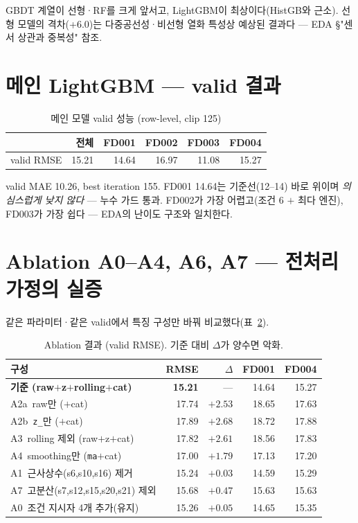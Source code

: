 \documentclass[11pt]{article}
\begin{document}
GBDT 계열이 선형·RF를 크게 앞서고, LightGBM이 최상이다(HistGB와 근소).
선형 모델의 격차(+6.0)는 다중공선성·비선형 열화 특성상 예상된 결과다 — EDA \S "센서 상관과 중복성" 참조.

\section{메인 LightGBM — valid 결과}

\begin{table}[H]
\centering
\caption{메인 모델 valid 성능 (row-level, clip 125)}
\label{tab:main}
\begin{tabular}{lrrrrr}
\toprule
 & 전체 & FD001 & FD002 & FD003 & FD004 \\
\midrule
valid RMSE & 15.21 & 14.64 & 16.97 & 11.08 & 15.27 \\
\bottomrule
\end{tabular}
\end{table}

valid MAE 10.26, best iteration 155.
FD001 14.64는 기준선(12--14) 바로 위이며 \emph{의심스럽게 낮지 않다} — 누수 가드 통과.
FD002가 가장 어렵고(조건 6 $+$ 최다 엔진), FD003가 가장 쉽다 — EDA의 난이도 구조와 일치한다.

\section{Ablation A0--A4, A6, A7 — 전처리 가정의 실증}

같은 파라미터·같은 valid에서 특징 구성만 바꿔 비교했다(표~\ref{tab:abl}).

\begin{table}[H]
\centering
\caption{Ablation 결과 (valid RMSE). 기준 대비 $\Delta$가 양수면 악화.}
\label{tab:abl}
\begin{tabular}{lrrrr}
\toprule
구성 & RMSE & $\Delta$ & FD001 & FD004 \\
\midrule
\textbf{기준 (raw$+$z$+$rolling$+$cat)} & \textbf{15.21} & — & 14.64 & 15.27 \\
A2a\ raw만 ($+$cat) & 17.74 & $+2.53$ & 18.65 & 17.63 \\
A2b\ \texttt{z\_}만 ($+$cat) & 17.89 & $+2.68$ & 18.72 & 17.88 \\
A3\ rolling 제외 (raw$+$z$+$cat) & 17.82 & $+2.61$ & 18.56 & 17.83 \\
A4\ smoothing만 (\texttt{ma}$+$cat) & 17.00 & $+1.79$ & 17.13 & 17.20 \\
A1\ 근사상수(s6,s10,s16) 제거 & 15.24 & $+0.03$ & 14.59 & 15.29 \\
A7\ 고분산(s7,s12,s15,s20,s21) 제외 & 15.68 & $+0.47$ & 15.63 & 15.63 \\
A0\ 조건 지시자 4개 추가(유지) & 15.26 & $+0.05$ & 14.65 & 15.35 \\
\bottomrule
\end{tabular}
\end{table}
\end{document}
